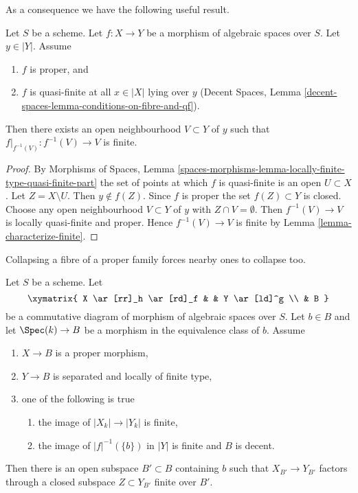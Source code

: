 \noindent
As a consequence we have the following useful result.

\begin{lemma}
\label{lemma-proper-finite-fibre-finite-in-neighbourhood}
Let $S$ be a scheme. Let $f : X \to Y$ be a morphism of algebraic spaces
over $S$. Let $y \in |Y|$. Assume
\begin{enumerate}
\item $f$ is proper, and
\item $f$ is quasi-finite at all $x \in |X|$ lying over $y$
(Decent Spaces, Lemma \ref{decent-spaces-lemma-conditions-on-fibre-and-qf}).
\end{enumerate}
Then there exists an open neighbourhood $V \subset Y$ of $y$
such that $f|_{f^{-1}(V)} : f^{-1}(V) \to V$ is finite.
\end{lemma}

\begin{proof}
By
Morphisms of Spaces, Lemma
\ref{spaces-morphisms-lemma-locally-finite-type-quasi-finite-part} the
set of points at which $f$ is quasi-finite is an open $U \subset X$.
Let $Z = X \setminus U$. Then $y \not \in f(Z)$. Since $f$ is proper
the set $f(Z) \subset Y$ is closed. Choose any open neighbourhood
$V \subset Y$ of $y$ with $Z \cap V = \emptyset$. Then
$f^{-1}(V) \to V$ is locally quasi-finite and proper.
Hence $f^{-1}(V) \to V$ is finite by Lemma \ref{lemma-characterize-finite}.
\end{proof}

\begin{lemma}
\label{lemma-flat-proper-family-cannot-collapse-fibre}
\begin{slogan}
Collapsing a fibre of a proper family forces nearby ones to collapse too.
\end{slogan}
Let $S$ be a scheme. Let
$$
\xymatrix{
X \ar[rr]_h \ar[rd]_f & & Y \ar[ld]^g \\
& B
}
$$
be a commutative diagram of morphism of algebraic spaces over $S$.
Let $b \in B$ and let $\Spec(k) \to B$ be a morphism in the equivalence
class of $b$. Assume
\begin{enumerate}
\item $X \to B$ is a proper morphism,
\item $Y \to B$ is separated and locally of finite type,
\item one of the following is true
\begin{enumerate}
\item the image of $|X_k| \to |Y_k|$ is finite,
\item the image of $|f|^{-1}(\{b\})$ in $|Y|$ is finite
and $B$ is decent.
\end{enumerate}
\end{enumerate}
Then there is an open
subspace $B' \subset B$ containing $b$ such that $X_{B'} \to Y_{B'}$
factors through a closed subspace $Z \subset Y_{B'}$ finite over $B'$.
\end{lemma}

